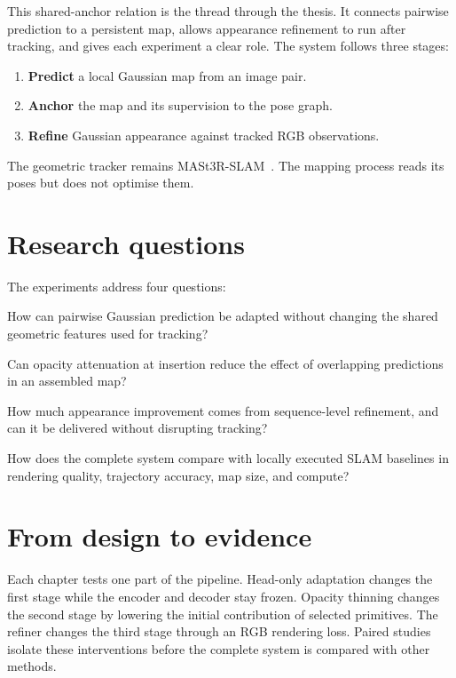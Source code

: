 This shared-anchor relation is the thread through the thesis. It connects
pairwise prediction to a persistent map, allows appearance refinement to
run after tracking, and gives each experiment a clear role. The system
follows three stages:
\begin{enumerate}\itemsep3pt
\item \textbf{Predict} a local Gaussian map from an image pair.
\item \textbf{Anchor} the map and its supervision to the pose graph.
\item \textbf{Refine} Gaussian appearance against tracked RGB observations.
\end{enumerate}
The geometric tracker remains MASt3R-SLAM~\cite{murai2025mast3rslam}.
The mapping process reads its poses but does not optimise them.

\section{Research questions}
\label{sec:intro:rq}

The experiments address four questions:
\begin{description}\itemsep4pt
\item[RQ1] How can pairwise Gaussian prediction be adapted without changing
the shared geometric features used for tracking?
\item[RQ2] Can opacity attenuation at insertion reduce the effect of
overlapping predictions in an assembled map?
\item[RQ3] How much appearance improvement comes from sequence-level
refinement, and can it be delivered without disrupting tracking?
\item[RQ4] How does the complete system compare with locally executed SLAM
baselines in rendering quality, trajectory accuracy, map size, and compute?
\end{description}

\section{From design to evidence}

Each chapter tests one part of the pipeline. Head-only adaptation changes
the first stage while the encoder and decoder stay frozen. Opacity thinning
changes the second stage by lowering the initial contribution of selected
primitives. The refiner changes the third stage through an RGB rendering
loss. Paired studies isolate these interventions before the complete system
is compared with other methods.

